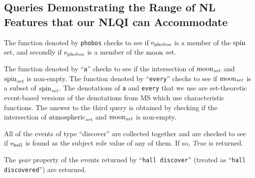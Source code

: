 \documentclass[../main.tex]{subfiles}
\begin{document}
\begin{refsection}
\subsection{Queries Demonstrating the Range of NL Features that our NLQI can Accommodate}
\label{webist2019journal:nlexamples}



\examplespacing

\noindent The function denoted by \texttt{phobos} checks to see if $\mathrm{e}_{\operatorname{phobos}}$ is a member of the $\operatorname{spin}$ set, and secondly if $\mathrm{e}_{\operatorname{phobos}}$ is a member of the $\operatorname{moon}$ set.

\examplespacing




\examplespacing

\noindent The function denoted by ``\texttt{a}'' checks to see if the intersection of $\operatorname{moon}_{\operatorname{\mathit{set}}}$ and $\operatorname{spin}_{\operatorname{\mathit{set}}}$ is non-empty. The function denoted by ``\texttt{every}'' checks to see if $\operatorname{moon}_{\operatorname{\mathit{set}}}$ is a subset of $\operatorname{spin}_{\operatorname{\mathit{set}}}$. The denotations of \texttt{a} and \texttt{every} that we use are set-theoretic event-based versions of the denotations from MS which use characteristic functions.  The answer to the third query is obtained by checking if the intersection of $\operatorname{atmospheric}_{\operatorname{\mathit{set}}}$ and $\operatorname{moon}_{\operatorname{\mathit{set}}}$ is non-empty.

\examplespacing


\examplespacing

\noindent All of the events of type ``discover'' are collected together and are checked to see if $\mathrm{e}_{\operatorname{hall}}$ is found as the subject role value of any of them. If so, \textit{True} is returned.

\examplespacing


\examplespacing

\noindent The {\em year} property of the  events returned by ``\texttt{hall discover}'' (treated as ``\texttt{hall discovered}'') are returned.

\examplespacing


\end{refsection}
\end{document}
